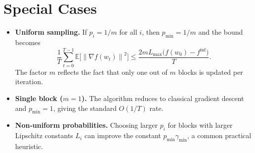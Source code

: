\documentclass{article}
\newcommand{\E}{\mathbb{E}}
\newcommand{\norm}[1]{\left\lVert #1\right\rVert}
\begin{document}
\section*{Special Cases}
\begin{itemize}
\item \textbf{Uniform sampling.} If $p_i=1/m$ for all $i$, then $p_{\min}=1/m$ and the bound becomes
\[
\frac{1}{T}\sum_{t=0}^{T-1}\E\!\bigl[\norm{\nabla f(w_t)}^{2}\bigr]
\le
\frac{2mL_{\max}\bigl(f(w_0)-f^{\inf}\bigr)}{T}.
\]
The factor $m$ reflects the fact that only one out of $m$ blocks is updated per iteration.

\item \textbf{Single block ($m=1$).} The algorithm reduces to classical gradient descent and $p_{\min}=1$, giving the standard $O(1/T)$ rate.

\item \textbf{Non‑uniform probabilities.} Choosing larger $p_i$ for blocks with larger Lipschitz constants $L_i$ can improve the constant $p_{\min}\gamma_{\min}$, a common practical heuristic.
\end{itemize}
\end{document}
